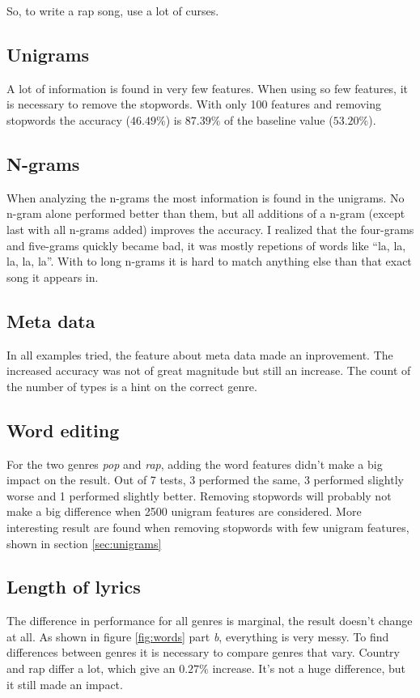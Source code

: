 \documentclass[a4paper, 12pt]{article}
\begin{document}
So, to write a rap song, use a lot of curses.

\subsection{Unigrams}
A lot of information is found in very few features.
When using so few features, it is necessary to remove the stopwords.
With only 100 features and removing stopwords the accuracy ($46.49\%$) is $87.39\%$ of the baseline value ($53.20\%$).

\subsection{N-grams}
When analyzing the n-grams the most information is found in the unigrams.
No n-gram alone performed better than them, but all additions of a n-gram (except last with all n-grams added) improves the accuracy.
I realized that the four-grams and five-grams quickly became bad, it was mostly repetions of words like ``la, la, la, la, la''.
With to long n-grams it is hard to match anything else than that exact song it appears in.

\subsection{Meta data}
In all examples tried, the feature about meta data made an inprovement.
The increased accuracy was not of great magnitude but still an increase.
The count of the number of types is a hint on the correct genre.

\subsection{Word editing}
For the two genres \textit{pop} and \textit{rap}, adding the word features didn't make a big impact on the result.
Out of 7 tests, 3 performed the same, 3 performed slightly worse and 1 performed slightly better.
Removing stopwords will probably not make a big difference when 2500 unigram features are considered.
More interesting result are found when removing stopwords with few unigram features, shown in section \ref{sec:unigrams}

\subsection{Length of lyrics}
The difference in performance for all genres is marginal, the result doesn't change at all.
As shown in figure \ref{fig:words} part \textit{b}, everything is very messy.
To find differences between genres it is necessary to compare genres that vary.
Country and rap differ a lot, which give an $0.27\%$ increase.
It's not a huge difference, but it still made an impact.
\end{document}
